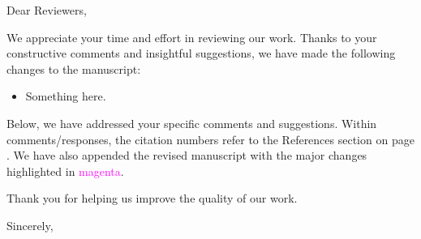 Dear Reviewers,

We appreciate your time and effort in reviewing our work. Thanks to your constructive comments and insightful suggestions, we have made the following changes to the manuscript:
\begin{itemize}
    \item{%
        Something here.
    }%
\end{itemize}
Below, we have addressed your specific comments and suggestions. Within comments/responses, the citation numbers refer to the References section on page \pageref{endofcontent}. We have also appended the revised manuscript with the major changes highlighted in \textcolor{magenta}{magenta}.

Thank you for helping us improve the quality of our work.

Sincerely,\\[1em]%
\theauthor